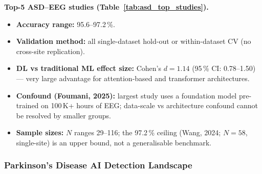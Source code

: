 \noindent\textbf{Top-5 ASD--EEG studies (Table~\ref{tab:asd_top_studies}).}
\begin{itemize}[leftmargin=*, itemsep=2pt]
    \item \textbf{Accuracy range:} 95.6--97.2\,\%.
    \item \textbf{Validation method:} all single-dataset hold-out or within-dataset CV (no cross-site replication).
    \item \textbf{DL vs traditional ML effect size:} Cohen's $d = 1.14$ (95\,\% CI: 0.78--1.50) --- very large advantage for attention-based and transformer architectures.
    \item \textbf{Confound (Foumani, 2025):} largest study uses a foundation model pre-trained on 100\,K+ hours of EEG; data-scale vs architecture confound cannot be resolved by smaller groups.
    \item \textbf{Sample sizes:} $N$ ranges 29--116; the 97.2\,\% ceiling (Wang, 2024; $N = 58$, single-site) is an upper bound, not a generalisable benchmark.
\end{itemize}

\iffalse %
\subsubsection{Parkinson's Disease AI Detection Landscape}

